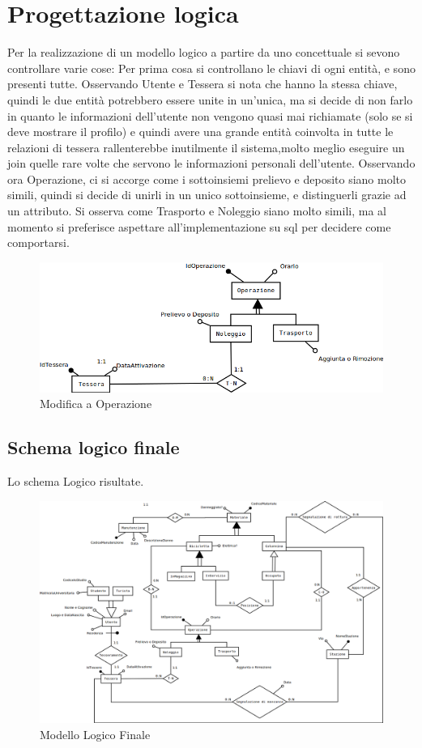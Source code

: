 \documentclass[a4paper,twoside]{article}
\begin{document}
\section{Progettazione logica}
Per la realizzazione di un modello logico a partire da uno concettuale si sevono controllare varie cose:\newline
Per prima cosa si controllano le chiavi di ogni entità, e sono presenti tutte.\newline
Osservando Utente e Tessera si nota che hanno la stessa chiave, quindi le due entità potrebbero essere unite in un'unica, ma si decide di non farlo in quanto le informazioni dell'utente non vengono quasi mai richiamate (solo se si deve mostrare il profilo) e quindi avere una grande entità coinvolta in tutte le relazioni di tessera rallenterebbe inutilmente il sistema,molto meglio eseguire un join quelle rare volte che servono le informazioni personali dell'utente.\newline
Osservando ora Operazione, ci si accorge come i sottoinsiemi prelievo e deposito siano molto simili, quindi si decide di unirli in un unico sottoinsieme, e distinguerli grazie ad un attributo.\newline
Si osserva come Trasporto e Noleggio siano molto simili, ma al momento si preferisce aspettare all'implementazione su sql per decidere come comportarsi.
\begin{figure}[H]
 \centering
  \includegraphics[width=1\textwidth]{Logico01}
\caption{Modifica a Operazione}
\end{figure}
\newpage
\subsection{Schema logico finale}
Lo schema Logico risultate.
\begin{figure}[H]
 \centering
  \includegraphics[width=1.35\textwidth,angle=90]{LogicoFinale}
\caption{Modello Logico Finale}
\end{figure}
\newpage
\end{document}
